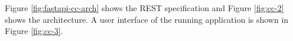 Figure \ref{fig:fastapi-cc-arch} shows the REST specification and Figure \ref{fig:cc-2} shows the architecture. A user interface of the running application is shown in Figure \ref{fig:cc-3}.



